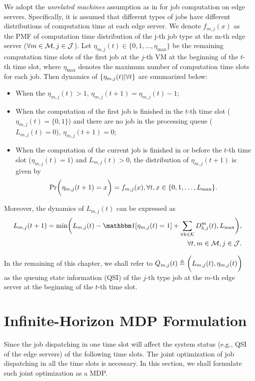 We adopt the \emph{unrelated machines} assumption as in \cite{tan-online} for job computation on edge servers. Specifically, it is assumed that different types of jobs have different distributions of computation time at each edge server.
We denote $f_{m,j}(x)$ as the PMF of computation time distribution of the j-th job type at the m-th edge server ($\forall m\in\mathcal{M}, j \in \mathcal{J}$).
Let $\eta_{m,j}(t)\in\{0,1,\dots,\eta_{{\max}}\}$ be the remaining computation time slots of the first job at the $j$-th VM at the beginning of the $t$-th time slot, where $\eta_{{\max}}$ denotes the maximum number of computation time slots for each job. Then dynamics of  $\{\eta_{m,j}(t)|\forall t\}$ are summarized below: 
\begin{itemize}
    \item When the $\eta_{m,j}(t)>1$,  $\eta_{m,j}(t+1)=\eta_{m,j}(t)-1$;
    \item When the computation of the first job is finished in the $t$-th time slot ($ \eta_{m,j}(t)= \{0,1\} $) and there are no job in the processing queue ($ L_{m,j}(t)=0 $), ${\eta}_{m,j}(t+1)=0$;
    \item When the computation of the current job is finished in or before the $t$-th time slot ($ \eta_{m,j}(t)= 1 $) and $ L_{m,j}(t)>0 $, the distribution of $\eta_{m,j}(t+1)$ is given by 
    \begin{align}
    \Pr\Paren{ \eta_{m,j}(t+1)=x } = f_{m,j}(x), \forall t, x\in \set{0,1,\dots,L_{{\max}}}.
    \end{align}
\end{itemize}
Moreover, the dynamics of $L_{m,j}(t)$ can be expressed as
\begin{align}
    L_{m,j}(t+1) = \min\Paren{
        L_{m,j}(t) - \indicator[\eta_{m,j}(t)=1] + \sum_{\forall k \in \apSet}D_{k,j}^m(t), L_{{\max}}
    },
    \nonumber\\ 
    \forall t, m\in\esSet,j\in\jSpace.
\end{align}
 
In the remaining of this chapter, we shall refer to
$
Q_{m,j}(t) \triangleq \bigg( L_{m,j}(t), \eta_{m,j}(t) \bigg)
$
as the queuing state information (QSI) of the $j$-th type job at the $m$-th edge server at the beginning of the $t$-th time slot.


\section{Infinite-Horizon MDP Formulation}
\label{sec:chapter3_prev-formulation}
Since the job dispatching in one time slot will affect the system status (e.g., QSI of the edge servers) of the following time slots.
The joint optimization of job dispatching in all the time slots is necessary. In this section, we shall formulate such joint optimization as a MDP. 

